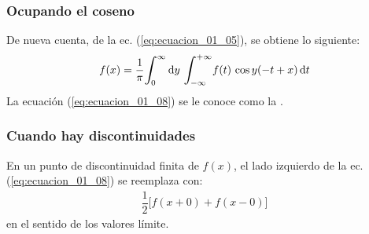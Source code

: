 \documentclass[12pt]{beamer}
\begin{document}
\begin{frame}
\frametitle{Ocupando el coseno}
De nueva cuenta, de la ec. (\ref{eq:ecuacion_01_05}), se obtiene lo siguiente:
\pause
\begin{align}
f (x) = \dfrac{1}{\pi} \scaleint{6ex}_{\bs 0}^{\infty}  \dd{y} \, \scaleint{6ex}_{\bs -\infty}^{+\infty} f (t) \, \cos y (-t + x) \dd{t} \label{eq:ecuacion_01_08}
\end{align}
\pause
La ecuación (\ref{eq:ecuacion_01_08}) se le conoce como la .
\end{frame}
\begin{frame}
\frametitle{Cuando hay discontinuidades}
En un punto de discontinuidad finita de $f (x)$, el lado izquierdo de la ec. (\ref{eq:ecuacion_01_08}) se reemplaza con:
\pause
\begin{align*}
\dfrac{1}{2} \big[ f (x + 0) + f (x - 0) \big]
\end{align*}
en el sentido de los valores límite.
\end{frame}
\end{document}
